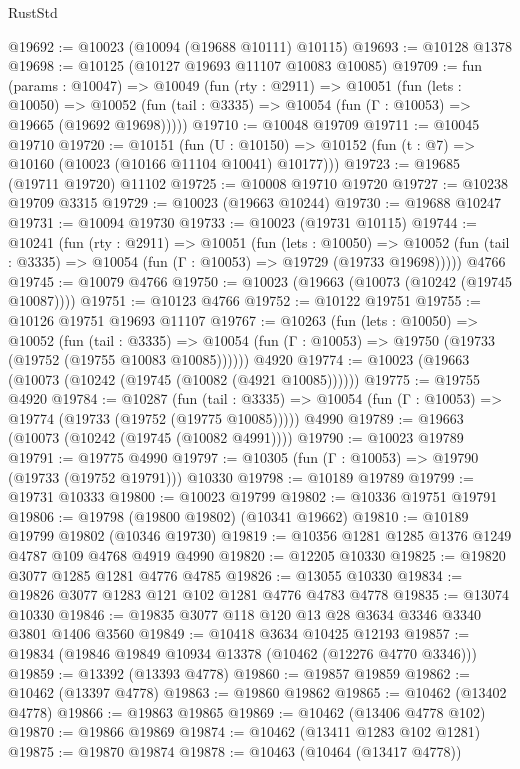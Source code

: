 \begin{lexlean}{RustStd}
\begin{coremodule}
@19692 := @10023 (@10094 (@19688 @10111) @10115)
@19693 := @10128 @1378
@19698 := @10125 (@10127 @19693 @11107 @10083 @10085)
@19709 := fun (params : @10047) =>
  @10049
    (fun (rty : @2911) =>
    @10051
      (fun (lets : @10050) =>
      @10052 (fun (tail : @3335) => @10054 (fun (Γ : @10053) => @19665 (@19692 @19698)))))
@19710 := @10048 @19709
@19711 := @10045 @19710
@19720 := @10151
    (fun (U : @10150) => @10152 (fun (t : @7) => @10160 (@10023 (@10166 @11104 @10041) @10177)))
@19723 := @19685 (@19711 @19720) @11102
@19725 := @10008 @19710 @19720
@19727 := @10238 @19709 @3315
@19729 := @10023 (@19663 @10244)
@19730 := @19688 @10247
@19731 := @10094 @19730
@19733 := @10023 (@19731 @10115)
@19744 := @10241
    (fun (rty : @2911) =>
    @10051
      (fun (lets : @10050) =>
      @10052 (fun (tail : @3335) => @10054 (fun (Γ : @10053) => @19729 (@19733 @19698)))))
    @4766
@19745 := @10079 @4766
@19750 := @10023 (@19663 (@10073 (@10242 (@19745 @10087))))
@19751 := @10123 @4766
@19752 := @10122 @19751
@19755 := @10126 @19751 @19693 @11107
@19767 := @10263
    (fun (lets : @10050) =>
    @10052
      (fun (tail : @3335) =>
      @10054 (fun (Γ : @10053) => @19750 (@19733 (@19752 (@19755 @10083 @10085))))))
    @4920
@19774 := @10023 (@19663 (@10073 (@10242 (@19745 (@10082 (@4921 @10085))))))
@19775 := @19755 @4920
@19784 := @10287
    (fun (tail : @3335) => @10054 (fun (Γ : @10053) => @19774 (@19733 (@19752 (@19775 @10085)))))
    @4990
@19789 := @19663 (@10073 (@10242 (@19745 (@10082 @4991))))
@19790 := @10023 @19789
@19791 := @19775 @4990
@19797 := @10305 (fun (Γ : @10053) => @19790 (@19733 (@19752 @19791))) @10330
@19798 := @10189 @19789
@19799 := @19731 @10333
@19800 := @10023 @19799
@19802 := @10336 @19751 @19791
@19806 := @19798 (@19800 @19802) (@10341 @19662)
@19810 := @10189 @19799 @19802 (@10346 @19730)
@19819 := @10356 @1281 @1285 @1376 @1249 @4787 @109 @4768 @4919 @4990
@19820 := @12205 @10330
@19825 := @19820 @3077 @1285 @1281 @4776 @4785
@19826 := @13055 @10330
@19834 := @19826 @3077 @1283 @121 @102 @1281 @4776 @4783 @4778
@19835 := @13074 @10330
@19846 := @19835 @3077 @118 @120 @13 @28 @3634 @3346 @3340 @3801 @1406 @3560
@19849 := @10418 @3634 @10425 @12193
@19857 := @19834 (@19846 @19849 @10934 @13378 (@10462 (@12276 @4770 @3346)))
@19859 := @13392 (@13393 @4778)
@19860 := @19857 @19859
@19862 := @10462 (@13397 @4778)
@19863 := @19860 @19862
@19865 := @10462 (@13402 @4778)
@19866 := @19863 @19865
@19869 := @10462 (@13406 @4778 @102)
@19870 := @19866 @19869
@19874 := @10462 (@13411 @1283 @102 @1281)
@19875 := @19870 @19874
@19878 := @10463 (@10464 (@13417 @4778))

\end{coremodule}
\end{lexlean}
